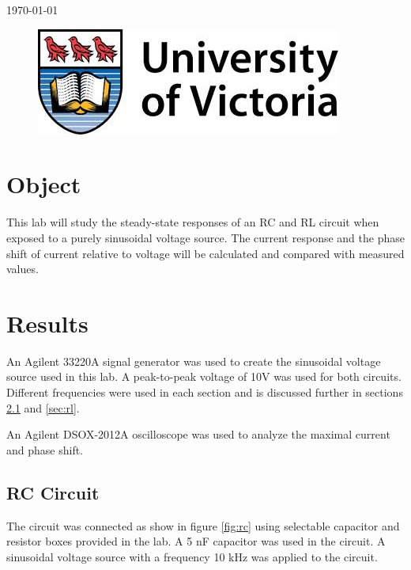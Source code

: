 \documentclass[12pt]{article}
\begin{document}
\begin{titlepage}
{\large \today}\\ %

\begin{figure}[b]	 %
	\centering
	\includegraphics[scale=0.3]{UVic_logo}
\end{figure}

\end{titlepage}





\section{Object}\label{sec:object}
This lab will study the steady-state responses of an RC and RL circuit when exposed to a purely sinusoidal voltage source. The current response and the phase shift of current relative to voltage will be calculated and compared with measured values.

\section{Results}\label{sec:results}
An Agilent 33220A signal generator was used to create the sinusoidal voltage source used in this lab. A peak-to-peak voltage of 10V was used for both circuits. Different frequencies were used in each section and is discussed further in sections \ref{sec:rc} and \ref{sec:rl}.

An Agilent DSOX-2012A oscilloscope was used to analyze the maximal current and phase shift.

\subsection{RC Circuit}\label{sec:rc}
The circuit was connected as show in figure \ref{fig:rc} using selectable capacitor and resistor boxes provided in the lab. A 5 nF capacitor was used in the circuit. A sinusoidal voltage source with a frequency 10 kHz was applied to the circuit.
\end{document}

